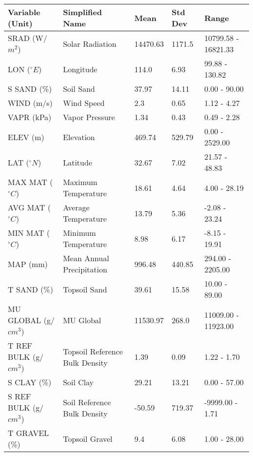 \documentclass[AutoFakeBold]{LZUThesis-PgD&PhD}
\begin{document}
\begin{table}[H]
		\label{tab:range}
		\begin{tabular}{lllll}
			\toprule
			Variable (Unit) & Simplified Name & Mean & Std Dev & Range \\
			\midrule
			SRAD (W/$m^2$) & Solar Radiation & 14470.63 & 1171.5 & 10799.58 - 16821.33 \\
			LON ($ ^\circ E$) & Longitude & 114.0 & 6.93 & 99.88 - 130.82 \\
			S SAND (\%) & Soil Sand & 37.97 & 14.11 & 0.00 - 90.00 \\
			WIND (m/s) & Wind Speed & 2.3 & 0.65 & 1.12 - 4.27 \\
			VAPR (kPa) & Vapor Pressure & 1.34 & 0.43 & 0.49 - 2.28 \\
			ELEV (m) & Elevation & 469.74 & 529.79 & 0.00 - 2529.00 \\
			LAT ($ ^\circ N$) & Latitude & 32.67 & 7.02 & 21.57 - 48.83 \\
			MAX MAT ($ ^\circ C$) & Maximum Temperature & 18.61 & 4.64 & 4.00 - 28.19 \\
			AVG MAT ($ ^\circ C$) & Average Temperature & 13.79 & 5.36 & -2.08 - 23.24 \\
			MIN MAT ($ ^\circ C$) & Minimum Temperature & 8.98 & 6.17 & -8.15 - 19.91 \\
			MAP (mm) & Mean Annual Precipitation & 996.48 & 440.85 & 294.00 - 2205.00 \\
			T SAND (\%) & Topsoil Sand & 39.61 & 15.58 & 10.00 - 89.00 \\
			MU GLOBAL (g/$cm^3$) & MU Global & 11530.97 & 268.0 & 11009.00 - 11923.00 \\
			T REF BULK (g/$cm^3$) & Topsoil Reference Bulk Density & 1.39 & 0.09 & 1.22 - 1.70 \\
			S CLAY (\%) & Soil Clay & 29.21 & 13.21 & 0.00 - 57.00 \\
			S REF BULK (g/$cm^3$) & Soil Reference Bulk Density & -50.59 & 719.37 & -9999.00 - 1.71 \\
			T GRAVEL (\%) & Topsoil Gravel & 9.4 & 6.08 & 1.00 - 28.00 \\
		\end{tabular}
	\end{table}
	
\end{document}
